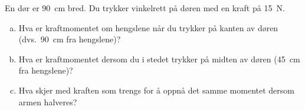 %
%
En dør er \SI{90}{\centi\metre} bred. Du trykker vinkelrett på døren med en kraft på \SI{15}{\newton}.
\begin{enumerate}[a)]
  \item Hva er kraftmomentet om hengslene når du trykker på kanten av døren (dvs.\ \SI{90}{\centi\metre} fra hengslene)?
  \item Hva er kraftmomentet dersom du i stedet trykker på midten av døren (\SI{45}{\centi\metre} fra hengslene)?
  \item Hva skjer med kraften som trengs for å oppnå det samme momentet dersom armen halveres?
\end{enumerate}
